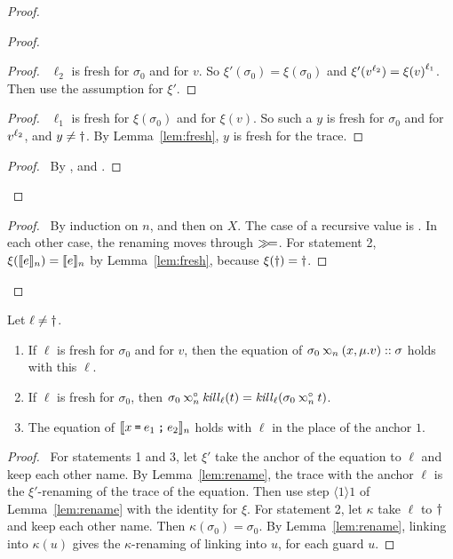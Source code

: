 \begin{proof}
\begin{proof}
    \begin{proof}
      \pf\ $\ell_2$ is fresh for $\sigma_0$ and for $v$.
      So $\xi'(\sigma_0)=\xi(\sigma_0)$ and $\xi'(\openloc{\ell_2}{v})=\openloc{\ell_1}{\xi(v)}$.
      Then use the assumption for $\xi'$.
    \end{proof}
    \begin{proof}
      \pf\ $\ell_1$ is fresh for $\xi(\sigma_0)$ and for $\xi(v)$.
      So such a $y$ is fresh for $\sigma_0$ and for $\openloc{\ell_2}{v}$, and $y\neq\dead$.
      By Lemma~\ref{lem:fresh}, $y$ is fresh for the trace.
    \end{proof}
    \qedstep
    \begin{proof}
      \pf\ By ,  and .
    \end{proof}
  \end{proof}
  \qedstep
  \begin{proof}
    \pf\ By induction on $n$, and then on $X$.
    The case of a recursive value is .
    In each other case, the renaming moves through $\bindt$.
    For statement 2, $\xi(\den{e}{n})=\den{e}{n}$ by Lemma~\ref{lem:fresh}, because $\xi(\dead)=\dead$.
  \end{proof}
\end{proof}

\begin{cor}\label{cor:anchor}
  Let $\ell\neq\dead$.
  \begin{enumerate}
    \item If $\ell$ is fresh for $\sigma_0$ and for $v$, then the equation of $\sigma_0\lk{n}(x,\muval{v})\cons\sigma$ holds with this $\ell$.
    \item If $\ell$ is fresh for $\sigma_0$, then $\sigma_0\splk{n}\killf{\ell}(t)=\killf{\ell}(\sigma_0\splk{n}t)$.
    \item The equation of $\den{\synbind{x}{e_1}{e_2}}{n}$ holds with $\ell$ in the place of the anchor $1$.
  \end{enumerate}
\end{cor}
\begin{proof}
  \pf\ For statements 1 and 3, let $\xi'$ take the anchor of the equation to $\ell$ and keep each other name.
  By Lemma~\ref{lem:rename}, the trace with the anchor $\ell$ is the $\xi'$-renaming of the trace of the equation.
  Then use step $\langle1\rangle1$ of Lemma~\ref{lem:rename} with the identity for $\xi$.
  For statement 2, let $\kappa$ take $\ell$ to $\dead$ and keep each other name.
  Then $\kappa(\sigma_0)=\sigma_0$.
  By Lemma~\ref{lem:rename}, linking into $\kappa(u)$ gives the $\kappa$-renaming of linking into $u$, for each guard $u$.
\end{proof}


